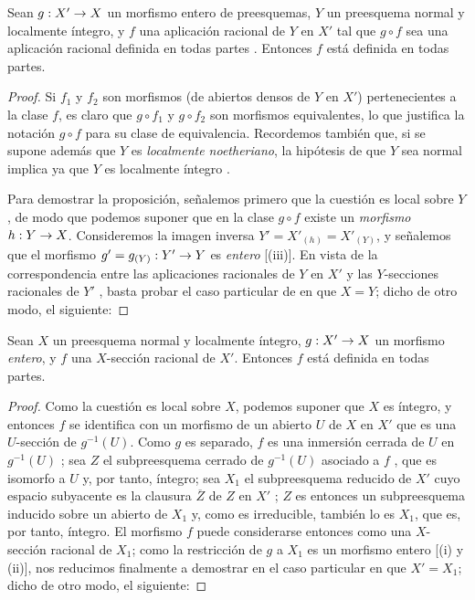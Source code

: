 \documentclass[oneside,10pt]{amsart}
\makeatletter
\newcommand{\ega@arrow}[2]{\mathchoice{#1}{#2}{#2}{#2}}
\renewcommand{\to}{\ega@arrow{\longrightarrow}{\rightarrow}}
\let\EGAOriginalLabel\label
\renewcommand{\label}[1]{\phantomsection\EGAOriginalLabel{#1}}
\makeatother
\begin{document}
\begin{proposition}[6.1.13]
\label{II.6.1.13}
Sean $g:X'\to X$ un morfismo entero de preesquemas, $Y$ un preesquema normal y localmente íntegro, y $f$ una aplicación racional de $Y$ en $X'$ tal que $g\circ f$ sea una aplicación racional definida en todas partes \textup{}.
Entonces $f$ está definida en todas partes.
\end{proposition}

\begin{proof}
Si $f_1$ y $f_2$ son morfismos (de abiertos densos de $Y$ en $X'$) pertenecientes a la clase $f$, es claro que $g\circ f_1$ y $g\circ f_2$ son morfismos equivalentes, lo que justifica la notación $g\circ f$ para su clase de equivalencia.
Recordemos también que, si se supone además que $Y$ es \emph{localmente noetheriano}, la hipótesis de que $Y$ sea normal implica ya que $Y$ es localmente íntegro .

Para demostrar la proposición, señalemos primero que la cuestión es local sobre $Y$, de modo que podemos suponer que en la clase $g\circ f$ existe un \emph{morfismo} $h:Y\to X$.
Consideremos la imagen inversa $Y'=X'_{(h)}=X'_{(Y)}$, y señalemos que el morfismo $g'=g_{(Y)}:Y'\to Y$ es \emph{entero} [(iii)].
En vista de la correspondencia entre las aplicaciones racionales de $Y$ en $X'$ y las $Y$-secciones racionales de $Y'$ , basta probar el caso particular de  en que $X=Y$; dicho de otro modo, el siguiente:
\end{proof}

\begin{corollary}[6.1.14]
\label{II.6.1.14}
Sean $X$ un preesquema normal y localmente íntegro, $g:X'\to X$ un morfismo \emph{entero}, y $f$ una $X$-sección racional de $X'$.
Entonces $f$ está definida en todas partes.
\end{corollary}

\begin{proof}
Como la cuestión es local sobre $X$, podemos suponer que $X$ es íntegro, y entonces $f$ se identifica con un morfismo de un abierto $U$ de $X$ en $X'$  que es una $U$-sección de $g^{-1}(U)$.
Como $g$ es separado, $f$ es una inmersión cerrada de $U$ en $g^{-1}(U)$ ;
sea $Z$ el subpreesquema cerrado de $g^{-1}(U)$ asociado a $f$ , que es isomorfo a $U$ y, por tanto, íntegro;
sea $X_1$ el subpreesquema reducido de $X'$ cuyo espacio subyacente es la clausura $\overline{Z}$ de $Z$ en $X'$ ;
$Z$ es entonces un subpreesquema inducido sobre un abierto de $X_1$  y, como es irreducible, también lo es $X_1$, que es, por tanto, íntegro.
El morfismo $f$ puede considerarse entonces como una $X$-sección racional de $X_1$;
como la restricción de $g$ a $X_1$ es un morfismo entero [(i) y (ii)], nos reducimos finalmente a demostrar  en el caso particular en que $X'=X_1$; dicho de otro modo, el siguiente:
\end{proof}
\end{document}
